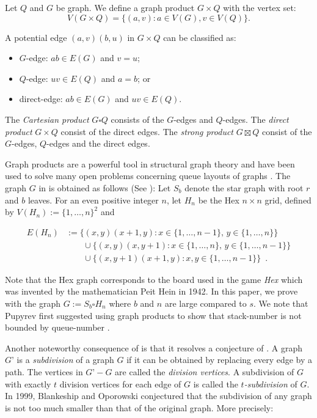 \documentclass[kpfonts]{patmorin}
\begin{document}
Let $Q$ and $G$ be graph. We define a graph product $G \times Q$ with the vertex set: 
$$V(G \times Q)= \{(a,v): a \in V(G), v \in V(Q)\}.$$

A potential edge $(a,v)(b,u)$ in $G \times Q$ can be classified as:
\begin{itemize}
	\item $G$-edge: $ab \in E(G)$ and $v=u$;	
	\item $Q$-edge: $uv \in E(Q)$ and $a=b$; or	
	\item direct-edge: $ab \in E(G)$ and $uv \in E(Q)$.
\end{itemize}


The \textit{Cartesian product} $G \square Q$ consists of the $G$-edges and $Q$-edges. The \textit{direct product} $G \times Q$ consist of the direct edges. The \textit{strong product} $G \boxtimes Q$ consist of the $G$-edges, $Q$-edges and the direct edges.

Graph products are a powerful tool in structural graph theory and have been used to solve many open problems concerning queue layouts of graphs \cite{DJMMUW20,DMW}. The graph $G$ in  is obtained as follows (See ): Let $S_b$ denote the star graph with root $r$ and $b$ leaves. For an even positive integer $n$, let $H_n$ be the Hex $n \times n$ grid, defined by $V(H_n):=\{1,\ldots,n\}^2$ and

\begin{align*}
E(H_n) & :=\{(x,y)(x+1,y):x\in\{1,\ldots,n-1\},\,y\in\{1,\ldots,n\}\} \\
& \qquad \cup \{(x,y)(x,y+1):x\in\{1,\ldots,n\},\,y\in\{1,\ldots,n-1\}\} \\
& \qquad \cup \{(x,y+1)(x+1,y):x,y\in\{1,\ldots,n-1\}\} \enspace .
\end{align*}

Note that the Hex graph corresponds to the board used in the game \textit{Hex} which was invented by the mathematician Peit Hein in 1942. In this paper, we prove  with the graph $G:= S_b \square H_n$ where $b$ and $n$ are large compared to $s$. We note that Pupyrev first suggested using graph products to show that stack-number is not bounded by queue-number \cite{Pupyrev20}. 

Another noteworthy consequence of  is that it resolves a conjecture of \citet{BO99,BO01}. A graph $G’$ is a \textit{subdivision} of a graph $G$ if it can be obtained by replacing every edge by a path. The vertices in $G’-G$ are called the \textit{division vertices}. A subdivision of $G$ with exactly $t$ division vertices for each edge of $G$ is called the \textit{$t$-subdivision} of $G$. In 1999, Blankeship and Oporowski conjectured that the subdivision of any graph is not too much smaller than that of the original graph. More precisely:
\end{document}
